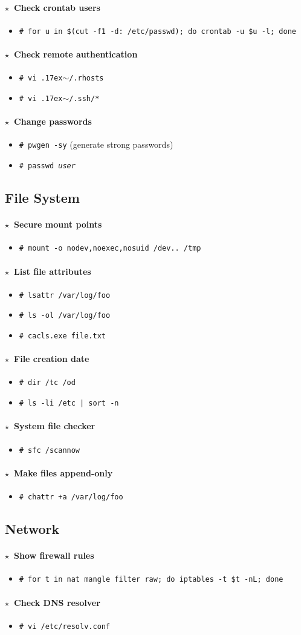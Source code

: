 \documentclass[10pt,landscape]{article}
\newcommand{\os}[1]{\texttt{\footnotesize{#1}}}
\newcommand{\unix}{\os{U}}
\newcommand{\bsd}{\os{B}}
\newcommand{\linux}{\os{L}}
\newcommand{\windows}{\os{W}}
\newenvironment{action}[1]
  {\paragraph{$\star$~#1}\begin{itemize}[leftmargin=1cm]}
  {\end{itemize}}
\newcommand{\cmd}[2]{\item[#1] {\small\tt\# #2}}
\newcommand{\comment}[1]{\textrm{\small(#1)}}
\newcommand{\home}{\raise.17ex\hbox{$\scriptstyle\sim$}}
\begin{document}
\begin{multicols*}{3}
\begin{action}{Check crontab users}
\cmd{\unix}{for u in \$(cut -f1 -d: /etc/passwd); do crontab -u \$u -l; done}
\end{action}

\begin{action}{Check remote authentication}
\cmd{\unix}{vi \home/.rhosts}
\cmd{\unix}{vi \home/.ssh/*}
\end{action}

\begin{action}{Change passwords}
\cmd{\unix}{pwgen -sy} \comment{generate strong passwords}
\cmd{\unix}{passwd \emph{user}}
\end{action}

\subsection*{File System}

\begin{action}{Secure mount points}
\cmd{\unix}{mount -o nodev,noexec,nosuid /dev.. /tmp}
\end{action}

\begin{action}{List file attributes}
\cmd{\linux}{lsattr /var/log/foo}
\cmd{\bsd}{ls -ol /var/log/foo}
\cmd{\windows}{cacls.exe file.txt}
\end{action}

\begin{action}{File creation date}
\cmd{\windows}{dir /tc /od}
\cmd{\unix}{ls -li /etc | sort -n}
\end{action}

\begin{action}{System file checker }
\cmd{\windows}{sfc /scannow}
\end{action}

\begin{action}{Make files append-only}
\cmd{\linux}{chattr +a /var/log/foo}
\end{action}

\subsection*{Network}

\begin{action}{Show firewall rules}
\cmd{\linux}{for t in nat mangle filter raw; do iptables -t \$t -nL; done}
\end{action}

\begin{action}{Check DNS resolver}
\cmd{\unix}{vi /etc/resolv.conf}
\end{action}


\end{multicols*}
\end{document}
